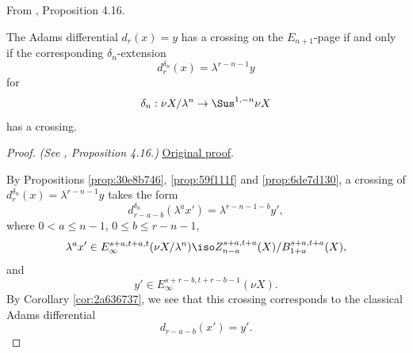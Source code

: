 \begin{proposition}
\label{paper:4.16}
From \cite{LWX126}, Proposition 4.16.\par
\label{prop:cross-dr-En}
    The Adams differential $d_r(x)=y$ has a crossing on the $E_{n+1}$-page if and only if the corresponding $\delta_n$-extension
    $$d^{\delta_n}_r(x)=\lambda^{r-n-1}y$$
    for
    $$\delta_{n}:\nu X/\lambda^{n}\to \Sus^{1,-n}\nu X$$
    has a crossing.


\end{proposition}
\begin{proof}
\textit{(See \cite{LWX126}, Proposition 4.16.)} \href{paper/main.tex.html#L1225}{Original proof}.

By Propositions \ref{prop:30e8b746}, \ref{prop:59f111f} and \ref{prop:6de7d130}, a crossing of $d^{\delta_n}_r(x)=\lambda^{r-n-1}y$ takes the form
    $$d^{\delta_n}_{r-a-b}(\lambda^a x')=\lambda^{r-n-1-b}y',$$
    where $0<a\le n-1$, $0\le b\le r-n-1$,
    $$\lambda^a x'\in E_\infty^{s+a,t+a,t}(\nu X/\lambda^n)\iso Z_{n-a}^{s+a,t+a}(X)/B_{1+a}^{s+a,t+a}(X),$$
    and
    $$y'\in E_\infty^{s+r-b, t+r-b-1}(\nu X).$$
    By Corollary \ref{cor:2a636737}, we see that this crossing corresponds to the classical Adams differential
    $$d_{r-a-b}(x')=y'.$$
\end{proof}

